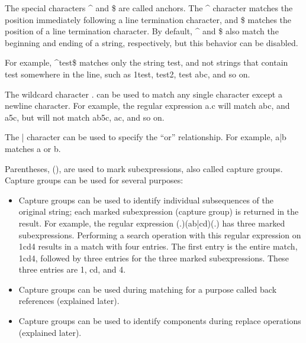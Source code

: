 

The special characters \^{} and \$ are called anchors. The \^{} character matches the position immediately following a line termination character, and \$ matches the position of a line termination character. By default, \^{} and \$ also match the beginning and ending of a string, respectively, but this behavior can be disabled.

For example, \^{}test\$ matches only the string test, and not strings that contain test somewhere in the line, such as 1test, test2, test abc, and so on.


The wildcard character . can be used to match any single character except a newline character. For example, the regular expression a.c will match abc, and a5c, but will not match ab5c, ac, and so on.


The | character can be used to specify the “or” relationship. For example, a|b matches a or b.


Parentheses, (), are used to mark subexpressions, also called capture groups. Capture groups can be used for several purposes:

\begin{itemize}
\item
Capture groups can be used to identify individual subsequences of the original string; each marked subexpression (capture group) is returned in the result. For example, the regular expression (.)(ab|cd)(.) has three marked subexpressions. Performing a search operation with this regular expression on 1cd4 results in a match with four entries. The first entry is the entire match, 1cd4, followed by three entries for the three marked subexpressions. These three entries are 1, cd, and 4.

\item
Capture groups can be used during matching for a purpose called back references (explained later).

\item
Capture groups can be used to identify components during replace operations (explained later).
\end{itemize}

